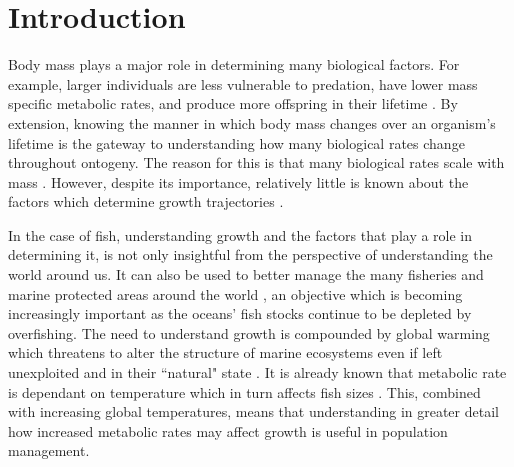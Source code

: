 \documentclass[a4paper, 11pt, hidelinks]{article} %
\begin{document}
	
	\tableofcontents
	\newpage
	\linenumbers
\section{Introduction}


	Body mass plays a major role in determining many biological factors.  For example, larger individuals are less vulnerable to predation, have lower mass specific metabolic rates, and produce more offspring in their lifetime \parencite{Peters1983, Magnhagen2001, Craig2006, Marshall2006, Hixon2014, Barneche2018}.
	By extension, knowing the manner in which body mass changes over an organism's lifetime is the gateway to understanding how many biological rates change throughout ontogeny.  The reason for this is that many biological rates scale with mass \parencite{Kleiber1932}.  However, despite its importance, relatively little is known about the factors which determine growth trajectories \parencite{Arendt2011, Marshall2019}.
	
	In the case of fish, understanding growth and the factors that play a role in determining it, is not only insightful from the perspective of understanding the world around us.  It can also be used to better manage the many fisheries and marine protected areas around the world \parencite{Lester2009, Heino2013}, an objective which is becoming increasingly important as the oceans' fish stocks continue to be depleted by overfishing. 
	The need to understand growth is compounded by global warming which threatens to alter the structure of marine ecosystems even if left unexploited and in their ``natural" state \parencite{Bruno2018}.
	It is already known that metabolic rate is dependant on temperature which in turn affects fish sizes \parencite{Gillooly2001, Brown2004}.  This, combined with increasing global temperatures, means that understanding in greater detail how increased metabolic rates %
	may affect growth is useful in population management.
	
\end{document}
